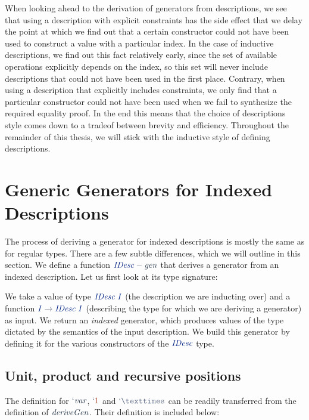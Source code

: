 \documentclass[a4paper,msc,twosized=semi]{uustthesis}
\newcommand{\includeagda}[2]{\vspace*{-0.25cm}\begin{center}{\fontsize{12}{14}\agdafont\ExecuteMetaData[../src/chap0#1/latex/code.tex]{#2}}\end{center}\vspace*{-0.25cm}}
\newcommand*{\mathcolor}{}
\def\mathcolor#1#{\mathcoloraux{#1}}
\newcommand*{\mathcoloraux}[3]{%
  \protect\leavevmode
  \begingroup
    \color#1{#2}#3%
  \endgroup
}
\newcommand{\HSNumeral}[1]{\mathcolor{hsred3}{#1}}
\newcommand{\HSSpecial}[1]{\mathcolor{hsblue4}{#1}}
\newcommand{\HSSym}[1]{\mathcolor{hsblue4}{#1}}
\newcommand{\HSCon}[1]{\mathcolor{hsblue3}{\mathit{#1}}}
\newcommand{\HSVar}[1]{\mathcolor{hsblue5}{\mathit{#1}}}
\begin{document}
  When looking ahead to the derivation of generators from descriptions, we see that 
  using a description with explicit constraints has the side effect that we delay the 
  point at which we find out that a certain constructor could not have been used to 
  construct a value with a particular index. In the case of inductive descriptions, we 
  find out this fact relatively early, since the set of available operations 
  explicitly depends on the index, so this set will never include descriptions that 
  could not have been used in the first place. Contrary, when using a description that 
  explicitly includes constraints, we only find that a particular constructor could 
  not have been used when we fail to synthesize the required equality proof. In the 
  end this means that the choice of descriptions style comes down to a tradeof between 
  brevity and efficiency. Throughout the remainder of this thesis, we will stick with 
  the inductive style of defining descriptions. 

\section{Generic Generators for Indexed Descriptions}

  The process of deriving a generator for indexed descriptions is mostly the same as 
  for regular types. There are a few subtle differences, which we will outline in this 
  section. We define a function \ensuremath{\HSCon{IDesc}\HSSym{-}\HSVar{gen}} that derives a generator from an indexed 
  description. Let us first look at its type signature: 

\includeagda{7}{idescgen}

  We take a value of type \ensuremath{\HSCon{IDesc}\;\HSCon{I}} (the description we are inducting over) and a 
  function \ensuremath{\HSCon{I}\HSSym{\to} \HSCon{IDesc}\;\HSCon{I}} (describing the type for which we are deriving a generator) 
  as input. We return an \emph{indexed} generator, which produces values of the type 
  dictated by the semantics of the input description. We build this generator by 
  defining it for the various constructors of the \ensuremath{\HSCon{IDesc}} type. 

\subsection{Unit, product and recursive positions}
  
  The definition for \ensuremath{\HSSpecial{`}\HSVar{var}}, \ensuremath{\HSSpecial{`}\HSNumeral{1}} and \ensuremath{\HSSpecial{`}\HSSym{×}} can be readily transferred from the 
  definition of \ensuremath{\HSVar{deriveGen}}. Their definition is included below: 
\end{document}
